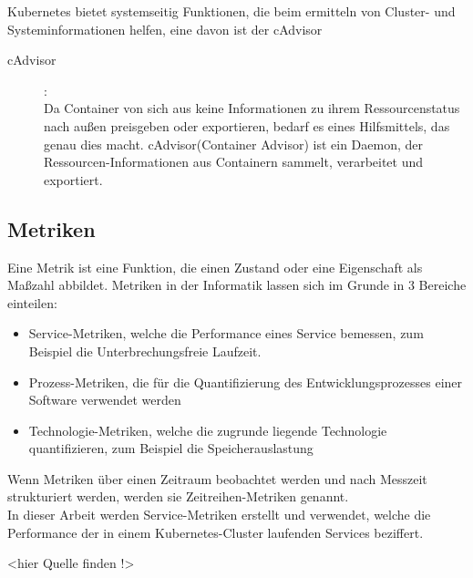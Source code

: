 \documentclass[a4paper,12pt]{scrartcl}
\begin{document}
Kubernetes bietet systemseitig Funktionen, die beim ermitteln von Cluster- und Systeminformationen helfen, eine davon ist der cAdvisor
 
\begin{description} 
\item [cAdvisor]:\\
Da Container von sich aus keine Informationen zu ihrem Ressourcenstatus nach außen preisgeben oder exportieren, bedarf es eines Hilfsmittels, das genau dies macht.
cAdvisor(Container Advisor) ist ein Daemon, der Ressourcen-Informationen aus Containern sammelt, verarbeitet und exportiert.\cite{.20200704T23:29:24.000Z}

\end{description}

\subsection{Metriken}

Eine Metrik ist eine Funktion, die einen Zustand oder eine Eigenschaft als Maßzahl
abbildet. Metriken in der Informatik lassen sich im Grunde in 3 Bereiche einteilen:
\begin{itemize}
\item Service-Metriken, welche die Performance eines Service bemessen, zum Beispiel die
Unterbrechungsfreie Laufzeit.
\item Prozess-Metriken, die für die Quantifizierung des Entwicklungsprozesses einer Software verwendet werden
\item Technologie-Metriken, welche die zugrunde liegende Technologie quantifizieren, zum
Beispiel die Speicherauslastung
\end{itemize}

Wenn Metriken über einen Zeitraum beobachtet werden und nach Messzeit strukturiert werden, werden sie Zeitreihen-Metriken genannt.\\
In dieser Arbeit werden Service-Metriken erstellt und verwendet, welche die Performance der in einem Kubernetes-Cluster laufenden Services beziffert.

<hier Quelle finden !>
\end{document}
